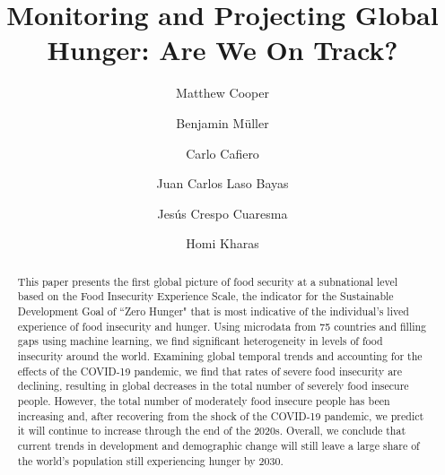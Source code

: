 \documentclass[titlepage]{article}
\begin{document}
\title{Monitoring and Projecting Global Hunger: Are We On Track?}

\author[1,2,*]{Matthew Cooper}
\author[2,3]{Benjamin Müller}
\author[4]{Carlo Cafiero}
\author[2,5]{Juan Carlos Laso Bayas}
\author[3,5,6,7]{Jesús Crespo Cuaresma}
\author[2,8]{Homi Kharas}


\begin{abstract}
This paper presents the first global picture of food security at a subnational level based on the Food Insecurity Experience Scale, the indicator for the Sustainable Development Goal of ``Zero Hunger" that is most indicative of the individual's lived experience of food insecurity and hunger.  Using microdata from 75 countries and filling gaps using machine learning, we find significant heterogeneity in levels of food insecurity around the world.  Examining global temporal trends and accounting for the effects of the COVID-19 pandemic, we find that rates of severe food insecurity are declining, resulting in global decreases in the total number of severely food insecure people.  However, the total number of moderately food insecure people has been increasing and, after recovering from the shock of the COVID-19 pandemic, we predict it will continue to increase through the end of the 2020s.  Overall, we conclude that current trends in development and demographic change will still leave a large share of the world's population still experiencing hunger by 2030.  \end{abstract}
\end{document}
